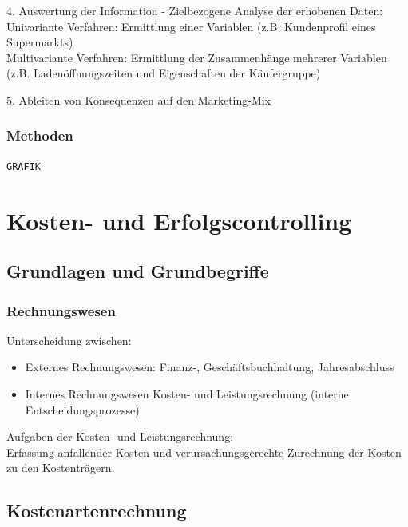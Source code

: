 \documentclass[a4paper,11pt, twoside]{article}
\begin{document}
4. Auswertung der Information - Zielbezogene Analyse der erhobenen Daten:\\
Univariante Verfahren: Ermittlung einer Variablen (z.B. Kundenprofil eines Supermarkts)\\
Multivariante Verfahren: Ermittlung der Zusammenhänge mehrerer Variablen (z.B. Ladenöffnungszeiten und Eigenschaften der Käufergruppe)

5. Ableiten von Konsequenzen auf den Marketing-Mix

\subsubsection*{Methoden}

\texttt{GRAFIK}








\newpage
\section{Kosten- und Erfolgscontrolling}

\subsection{Grundlagen und Grundbegriffe}

\subsubsection*{Rechnungswesen}
Unterscheidung zwischen:
\begin{itemize}
	\item Externes Rechnungswesen: Finanz-, Geschäftsbuchhaltung, Jahresabschluss
	\item Internes Rechnungswesen Kosten- und Leistungsrechnung (interne Entscheidungsprozesse)
\end{itemize}

Aufgaben der Kosten- und Leistungsrechnung:\\
Erfassung anfallender Kosten und verursachungsgerechte Zurechnung der Kosten zu den Kostenträgern.

\subsection{Kostenartenrechnung}
\end{document}
